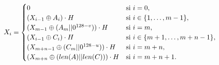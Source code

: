 \begin{itemize}
\begin{itemize}
		\begin{equation}
		  X_i =
			\begin{cases}
				0 & \text{si } i= 0, \\
				(X_{i-1}\oplus A_i)\cdot H & \text{si } i\in\{1,\dots,m-1\}, \\
				(X_{m-1}\oplus(A_m||0^{128-v}))\cdot H & \text{si } i= m, \\
				(X_{i-1}\oplus C_i)\cdot H & \text{si } i\in\{m+1,\dots,m+n-1\}, \\
				(X_{m+n-1}\oplus(C_m||0^{128-u}))\cdot H & \text{si } i= m+n, \\
				(X_{m+n}\oplus(len(A)||len(C)))\cdot H & \text{si } i=m+n+1.
			\end{cases}       
			\notag
		\end{equation}\\


\end{itemize}
\end{itemize}

